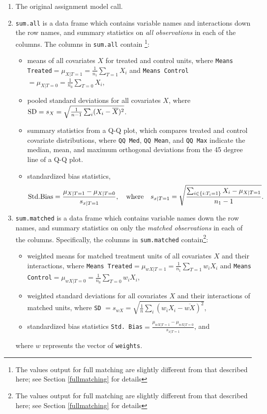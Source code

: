 \documentclass[oneside,letterpaper,titlepage]{article}
\begin{document}
\begin{enumerate}
\item The original assignment model call.
\item \texttt{sum.all} is a data frame which contains variable names
  and interactions down the row names, and summary statistics on
  \emph{all observations} in each of the columns.  The columns in
  \texttt{sum.all} contain \footnote{The values output for full
    matching are slightly different from that described here; see
    Section \ref{fullmatching} for details}:
  \begin{itemize}
  \item means of all covariates $X$ for treated and control units,
    where \texttt{Means Treated}$= \mu_{X|T=1} = \frac{1}{n_1}
    \sum_{T=1} X_i$ and \texttt{Means Control}$= \mu_{X|T=0} =
    \frac{1}{n_0} \sum_{T=0} X_i$,
  \item pooled standard deviations for all covariates $X$, where ${\rm
      SD} = s_X = \sqrt{\frac{1}{n-1} \sum_{i} (X_i -
      \overline{X})^2}$.
  \item summary statistics from a Q-Q plot, which compares treated and
    control covariate distributions, where \texttt{QQ Med}, \texttt{QQ
      Mean}, and \texttt{QQ Max} indicate the median, mean,
    and maximum orthogonal deviations from the 45 degree line of a Q-Q
    plot.
  \item standardized bias statistics, $${\rm Std.
      Bias}=\frac{\mu_{X|T=1} - \mu_{X|T=0}}{s_{x|T=1}}, \quad {\rm
      where} \quad s_{x|T=1} = \sqrt{\frac{\sum_{i \in \{i:
        T_i=1\}} X_i - \mu_{X|T=1}}{n_1-1} }.$$
  \end{itemize}
  
\item \texttt{sum.matched} is a data frame which contains variable
  names down the row names, and summary statistics on only the
  \emph{matched observations} in each of the columns.  Specifically,
  the columns in \texttt{sum.matched} contain\footnote{The values
    output for full matching are slightly different from that
    described here; see Section \ref{fullmatching} for details}:
  \begin{itemize}
  \item weighted means for matched treatment units of all covariates
    $X$ and their interactions, where \texttt{Means Treated}$=
    \mu_{wX|T=1} = \frac{1}{n_1} \sum_{T=1} w_iX_i$ and \texttt{Means
      Control}$=\mu_{wX|T=0} = \frac{1}{n_0} \sum_{T=0} w_iX_i$,
  \item weighted standard deviations for all covariates $X$ and their
    interactions of matched units, where \texttt{SD} $= s_{wX} =
    \sqrt{\frac{1}{n} \sum_{i} (w_iX_i - \overline{wX})^2}$,
  \item standardized bias statistics \texttt{Std. Bias}$=\frac{\mu_{wX|T=1} -
      \mu_{wX|T=0}}{s_{x|T=1}}$, and
  \end{itemize}
  where $w$ represents the vector of \texttt{weights}.  
  

\end{enumerate}
\end{document}
